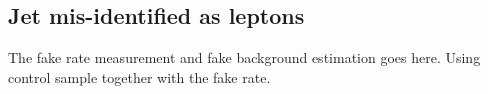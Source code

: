 \subsection{Jet mis-identified as leptons}
The fake rate measurement and fake background estimation goes here.
Using control sample together with the fake rate.
